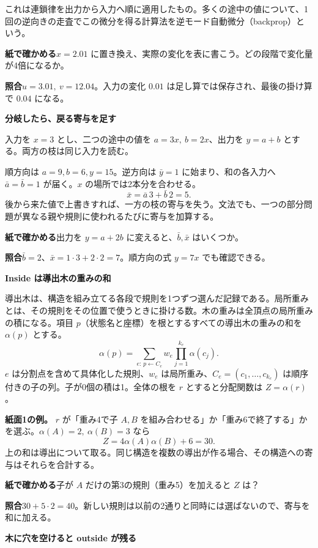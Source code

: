 \documentclass[a5paper,10pt]{ltjsarticle}
\newcommand{\unit}[2]{\clearpage{\small 動画①　#1}\par{\Large\bfseries #2}\par\medskip}
\newcommand{\task}[1]{\par\medskip\textbf{紙で確かめる}\quad #1}
\newcommand{\ans}[1]{\par\textbf{照合}\quad #1}
\begin{document}
これは連鎖律を出力から入力へ順に適用したもの。多くの途中の値について、1回の逆向きの走査でこの微分を得る計算法を逆モード自動微分（backprop）という。
\task{$x=2.01$ に置き換え、実際の変化を表に書こう。どの段階で変化量が4倍になるか。}
\ans{$u=3.01,\ v=12.04$。入力の変化 $0.01$ は足し算では保存され、最後の掛け算で $0.04$ になる。}
\unit{03:10 の次の画面}{分岐したら、戻る寄与を足す}
入力を $x=3$ とし、二つの途中の値を $a=3x,\ b=2x$、出力を $y=a+b$ とする。両方の枝は同じ入力を読む。
\begin{center}\end{center}
順方向は $a=9,b=6,y=15$。逆方向は $\bar y=1$ に始まり、和の各入力へ $\bar a=\bar b=1$ が届く。$x$ の場所では2本分を合わせる。
\[
\bar x=\bar a\,3+\bar b\,2=5.
\]
後から来た値で上書きすれば、一方の枝の寄与を失う。文法でも、一つの部分問題が異なる親や規則に使われるたびに寄与を加算する。
\task{出力を $y=a+2b$ に変えると、$\bar b,\bar x$ はいくつか。}
\ans{$\bar b=2$、$\bar x=1\cdot3+2\cdot2=7$。順方向の式 $y=7x$ でも確認できる。}
\unit{08:39}{Inside は導出木の重みの和}
導出木は、構造を組み立てる各段で規則を1つずつ選んだ記録である。局所重みとは、その規則をその位置で使うときに掛ける数。木の重みは全頂点の局所重みの積になる。項目 $p$（状態名と座標）を根とするすべての導出木の重みの和を $\alpha(p)$ とする。
\[
\alpha(p)=\sum_{e:\,p\leftarrow C_e} w_e\prod_{j=1}^{k_e}\alpha(c_j).
\]
$e$ は分割点を含めて具体化した規則、$w_e$ は局所重み、$C_e=(c_1,\ldots,c_{k_e})$ は順序付きの子の列。子が0個の積は1。全体の根を $r$ とすると分配関数は $Z=\alpha(r)$。
\par\textbf{紙面1の例。} $r$ が「重み4で子 $A,B$ を組み合わせる」か「重み6で終了する」かを選ぶ。$\alpha(A)=2,\ \alpha(B)=3$ なら
\[
Z=4\alpha(A)\alpha(B)+6=30.
\]
上の和は導出について取る。同じ構造を複数の導出が作る場合、その構造への寄与はそれらを合計する。
\task{子が $A$ だけの第3の規則（重み5）を加えると $Z$ は？}
\ans{$30+5\cdot2=40$。新しい規則は以前の2通りと同時には選ばないので、寄与を和に加える。}
\unit{10:09}{木に穴を空けると outside が残る}
\begin{center}\end{center}
\end{document}
